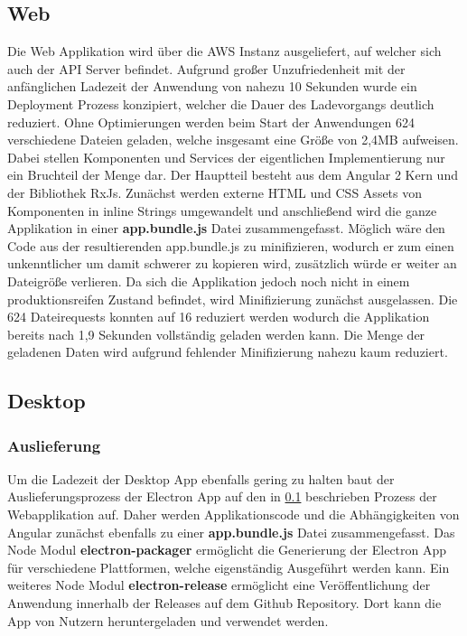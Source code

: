 \subsection{Web}
\label{deployment-web}

Die Web Applikation wird über die \ac{AWS} Instanz ausgeliefert, auf welcher sich auch der \ac{API} Server befindet.
Aufgrund großer Unzufriedenheit mit der anfänglichen Ladezeit der Anwendung von nahezu 10 Sekunden wurde ein Deployment
Prozess konzipiert, welcher die Dauer des Ladevorgangs deutlich reduziert.
Ohne Optimierungen werden beim Start der Anwendungen 624 verschiedene Dateien geladen,
welche insgesamt eine Größe von 2,4MB aufweisen.
Dabei stellen Komponenten und Services der eigentlichen Implementierung nur ein Bruchteil der Menge dar.
Der Hauptteil besteht aus dem Angular 2 Kern und der Bibliothek RxJs.
Zunächst werden externe \ac{HTML} und \ac{CSS} Assets von Komponenten in
inline Strings umgewandelt und anschließend wird die ganze Applikation in einer \textbf{app.bundle.js} Datei zusammengefasst.
Möglich wäre den Code aus der resultierenden app.bundle.js zu minifizieren,
wodurch er zum einen unkenntlicher um damit schwerer zu kopieren wird,
zusätzlich würde er weiter an Dateigröße verlieren. Da sich die Applikation \projectname{}
jedoch noch nicht in einem produktionsreifen Zustand befindet, wird Minifizierung zunächst ausgelassen.
Die 624 Dateirequests konnten auf 16 reduziert werden wodurch die Applikation bereits nach 1,9
Sekunden vollständig geladen werden kann.
Die Menge der geladenen Daten wird aufgrund fehlender Minifizierung nahezu kaum reduziert.

\subsection{Desktop}

\subsubsection{Auslieferung}
Um die Ladezeit der Desktop App ebenfalls gering zu halten baut der Auslieferungsprozess der Electron App
auf den in \ref{deployment-web} beschrieben Prozess der Webapplikation auf. Daher werden Applikationscode und die
Abhängigkeiten von Angular zunächst ebenfalls zu einer \textbf{app.bundle.js} Datei zusammengefasst.
Das Node Modul \textbf{electron-packager} ermöglicht die Generierung der Electron App für verschiedene Plattformen,
welche eigenständig Ausgeführt werden kann.
Ein weiteres Node Modul \textbf{electron-release} ermöglicht eine Veröffentlichung
der Anwendung innerhalb der Releases auf dem Github Repository.
Dort kann die App von Nutzern heruntergeladen und verwendet werden.

